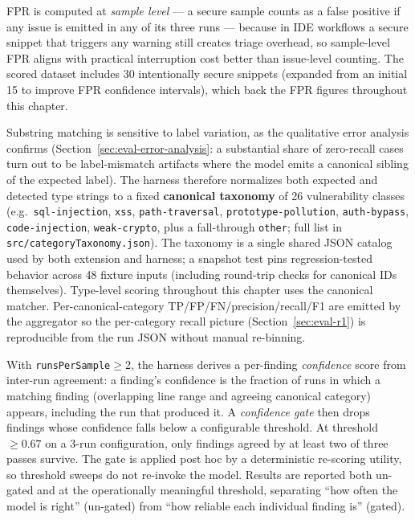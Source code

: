 FPR is computed at \emph{sample level} --- a secure sample counts as a false positive if any issue is emitted in any of its three runs --- because in IDE workflows a secure snippet that triggers any warning still creates triage overhead, so sample-level FPR aligns with practical interruption cost better than issue-level counting. The scored dataset includes 30 intentionally secure snippets (expanded from an initial 15 to improve FPR confidence intervals), which back the FPR figures throughout this chapter.

Substring matching is sensitive to label variation, as the qualitative error analysis confirms (Section~\ref{sec:eval-error-analysis}: a substantial share of zero-recall cases turn out to be label-mismatch artifacts where the model emits a canonical sibling of the expected label). The harness therefore normalizes both expected and detected type strings to a fixed \textbf{canonical taxonomy} of 26 vulnerability classes (e.g.\ \texttt{sql-injection}, \texttt{xss}, \texttt{path-traversal}, \texttt{prototype-pollution}, \texttt{auth-bypass}, \texttt{code-injection}, \texttt{weak-crypto}, plus a fall-through \texttt{other}; full list in \texttt{src/categoryTaxonomy.json}). The taxonomy is a single shared JSON catalog used by both extension and harness; a snapshot test pins regression-tested behavior across 48 fixture inputs (including round-trip checks for canonical IDs themselves). Type-level scoring throughout this chapter uses the canonical matcher. Per-canonical-category TP/FP/FN/precision/recall/F1 are emitted by the aggregator so the per-category recall picture (Section~\ref{sec:eval-r1}) is reproducible from the run JSON without manual re-binning.

With \texttt{runsPerSample}$\geq$2, the harness derives a per-finding \emph{confidence} score from inter-run agreement: a finding's confidence is the fraction of runs in which a matching finding (overlapping line range and agreeing canonical category) appears, including the run that produced it. A \emph{confidence gate} then drops findings whose confidence falls below a configurable threshold. At threshold $\geq 0.67$ on a 3-run configuration, only findings agreed by at least two of three passes survive. The gate is applied post hoc by a deterministic re-scoring utility, so threshold sweeps do not re-invoke the model. Results are reported both un-gated and at the operationally meaningful threshold, separating ``how often the model is right'' (un-gated) from ``how reliable each individual finding is'' (gated).

